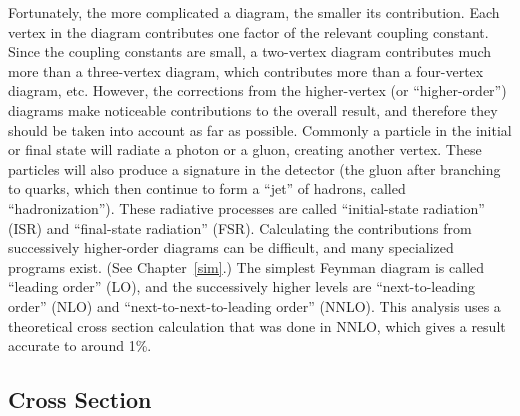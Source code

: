 Fortunately, the more complicated a diagram, 
the smaller its contribution.  
Each vertex in the diagram contributes 
one factor of the relevant coupling constant. 
Since the coupling constants are small, 
a two-vertex diagram contributes much more 
than a three-vertex diagram, 
which contributes more than a 
four-vertex diagram, etc.  
However, the corrections from the higher-vertex 
(or ``higher-order'') 
diagrams make noticeable contributions 
to the overall result, 
and therefore they should be taken into 
account as far as possible.  
Commonly a particle in the initial or final state 
will radiate a photon or a gluon, 
creating another vertex.  
These particles will also produce a signature 
in the detector 
(the gluon after branching to quarks, 
which then continue to form 
a ``jet'' of hadrons, 
called ``hadronization''). 
These radiative processes are called 
``initial-state radiation'' (ISR) and 
``final-state radiation'' (FSR).  
Calculating the contributions from 
successively higher-order diagrams 
can be difficult, %
and many specialized programs exist.  
(See Chapter~\ref{sim}.)  
The simplest Feynman diagram is called 
``leading order'' (LO), 
and the successively higher levels are 
``next-to-leading order'' (NLO) and 
``next-to-next-to-leading order'' (NNLO).  
This analysis uses a theoretical 
cross section calculation that 
was done in NNLO, 
which gives a result accurate to 
around 1\%.  










\subsection{\Zee Cross Section}
\label{theory:xsec}



